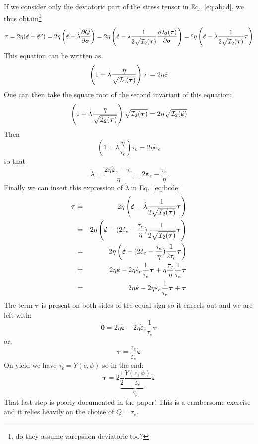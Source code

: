 If we consider only the deviatoric part of the stress tensor in Eq.~\eqref{eq:abcd}, we thus obtain\footnote{do they assume varepsilon deviatoric too?}
\begin{equation}
\bm \tau = 2 \eta (\dot{\bm \varepsilon} -\dot{\bm \varepsilon}^p)
= 2 \eta \left(\dot{\bm \varepsilon} - \dot\lambda \frac{\partial Q}{\partial \bm\sigma} \right)
= 2 \eta \left(\dot{\bm \varepsilon} - \dot\lambda \frac{1}{2 \sqrt{ {\cal I}_2(\bm\tau)}}  \frac{\partial {\cal I}_2(\bm\tau)}{\partial \bm\sigma} \right)
= 
2 \eta \left(\dot{\bm \varepsilon} - \dot\lambda \frac{1}{2 \sqrt{ {\cal I}_2(\bm\tau)}} \bm\tau \right) \label{eq:bcde}
\end{equation}
This equation can be written as
\[
\left( 1 + \dot\lambda \frac{\eta }{ \sqrt{ {\cal I}_2(\bm\tau)}} \right) \bm\tau
= 2 \eta \dot{\bm \varepsilon}
\]
One can then take the square root of the second invariant of this equation:
\[
\left( 1 + \dot\lambda \frac{\eta }{ \sqrt{ {\cal I}_2(\bm\tau)}} \right) 
\sqrt{{\cal I}_2(\bm\tau) }= 2 \eta \sqrt{{\cal I}_2(\dot{\bm \varepsilon})}
\]
Then 
\[
\left( 1 + \dot\lambda \frac{\eta }{ \tau_e} \right) 
\tau_e = 2 \eta \dot{\bm \varepsilon}_e
\]
so that 
\[
\dot\lambda 
= \frac{2 \eta \dot{\bm \varepsilon}_e - \tau_e}{\eta}
= 2 \dot{\bm \varepsilon}_e - \frac{\tau_e}{\eta}
\]
Finally we can insert this expression of $\dot\lambda$ in Eq.~\eqref{eq:bcde}
\begin{eqnarray}
\bm \tau 
&=&2 \eta \left(\dot{\bm \varepsilon} - \dot\lambda \frac{1}{2 \sqrt{ {\cal I}_2(\bm\tau)}} \bm\tau \right)  \\
&=& 2 \eta \left(\dot{\bm \varepsilon} -    
(2 \dot{ \varepsilon}_e - \frac{\tau_e}{\eta})
\frac{1}{2 \sqrt{ {\cal I}_2(\bm\tau)}} \bm\tau \right)  \\
&=& 2 \eta \left(\dot{\bm \varepsilon} -  
(2 \dot{ \varepsilon}_e - \frac{\tau_e}{\eta})   \frac{1}{2 \tau_e} \bm\tau \right) \\
&=& 2 \eta \dot{\bm \varepsilon} -  
2\eta \dot{\varepsilon}_e \frac{1}{ \tau_e} \bm\tau 
+ \eta \frac{\tau_e}{\eta}   \frac{1}{ \tau_e} \bm\tau \\
&=& 2 \eta \dot{\bm \varepsilon} -  
2\eta \dot{\varepsilon}_e \frac{1}{ \tau_e} \bm\tau +  \bm\tau \\
\end{eqnarray}
The term $\bm\tau$ is present on both sides of the equal sign so it cancels out
and we are left with:
\[
\bm 0 = 2 \eta \dot{\bm \varepsilon} -  
2\eta \dot{\varepsilon}_e \frac{1}{ \tau_e} \bm\tau 
\]
or,
\[
\bm\tau = \frac{\tau_e}{\dot{\varepsilon}_e}  \dot{\bm \varepsilon}
\]
On yield we have $\tau_e=Y(c,\phi)$ so in the end:
\[
{\bm\tau} = 2 \underbrace{
\frac12 \frac{Y(c,\phi)}{ \dot{\varepsilon}_e} 
}_{\eta_p}  \dot{\bm \varepsilon}
\]
That last step is poorly documented in the paper!
This is a cumbersome exercise and it relies heavily on the choice of $Q=\tau_e$.


